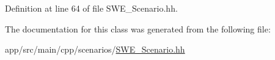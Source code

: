 Definition at line 64 of file S\+W\+E\+\_\+\+Scenario.\+hh.



The documentation for this class was generated from the following file\+:\begin{DoxyCompactItemize}
\item 
app/src/main/cpp/scenarios/\hyperlink{scenarios_2SWE__Scenario_8hh}{S\+W\+E\+\_\+\+Scenario.\+hh}\end{DoxyCompactItemize}
